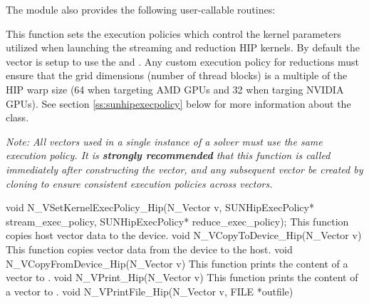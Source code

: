 The module {\nvechip} also provides the following user-callable routines:
{
  This function sets the execution policies which control the kernel parameters
  utilized when launching the streaming and reduction HIP kernels. By default
  the vector is setup to use the  and
  . Any custom execution policy for reductions
  must ensure that the grid dimensions (number of thread blocks) is a multiple of
  the HIP warp size (64 when targeting AMD GPUs and 32 when targing NVIDIA GPUs).
  See section \ref{ss:sunhipexecpolicy} below for more
  information about the  class.

  \textit{Note: All vectors used in a single instance of a {\sundials} solver must
  use the same execution policy. It is \textbf{strongly recommended} that
  this function is called immediately after constructing the vector, and
  any subsequent vector be created by cloning to ensure consistent execution
  policies across vectors.}
}
{
  void N\_VSetKernelExecPolicy\_Hip(N\_Vector v,
  SUNHipExecPolicy* stream\_exec\_policy,
  SUNHipExecPolicy* reduce\_exec\_policy);
}
{
 This function copies host vector data to the device.
}
{
 void N\_VCopyToDevice\_Hip(N\_Vector v)
}
{
 This function copies vector data from the device to the host.
}
{
 void N\_VCopyFromDevice\_Hip(N\_Vector v)
}
{
  This function prints the content of a {\hip} vector to .
}
{
  void N\_VPrint\_Hip(N\_Vector v)
}
{
  This function prints the content of a {\hip} vector to .
}
{
  void N\_VPrintFile\_Hip(N\_Vector v, FILE *outfile)
}

